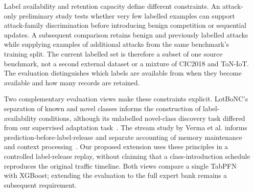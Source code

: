 \documentclass[sigconf,anonymous,pbalance]{acmart}
\begin{document}
Label availability and retention capacity define different constraints. An attack-only preliminary study tests whether very few labelled examples can support attack-family discrimination before introducing benign competition or sequential updates. A subsequent comparison retains benign and previously labelled attacks while supplying examples of additional attacks from the same benchmark's training split. The current labelled set is therefore a subset of one source benchmark, not a second external dataset or a mixture of CIC2018 and ToN-IoT. The evaluation distinguishes which labels are available from when they become available and how many records are retained.

Two complementary evaluation views make these constraints explicit. LotBoNC's separation of known and novel classes informs the construction of label-availability conditions, although its unlabelled novel-class discovery task differed from our supervised adaptation task~\cite{hu2026lotbonc}. The stream study by Verma et al. informs prediction-before-label-release and separate accounting of memory maintenance and context processing~\cite{verma2026rethinking}. Our proposed extension uses these principles in a controlled label-release replay, without claiming that a class-introduction schedule reproduces the original traffic timeline. Both views compare a single TabPFN with XGBoost; extending the evaluation to the full expert bank remains a subsequent requirement.
\end{document}
